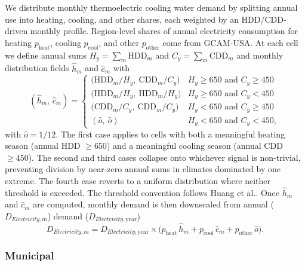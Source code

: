 \documentclass[fleqn,10pt]{wlscirep}
\begin{document}
We distribute monthly thermoelectric cooling water demand by splitting annual use into heating, cooling, and other shares, each weighted by an HDD/CDD-driven monthly profile. Region-level shares of annual electricity consumption for heating $p_{\mathrm{heat}}$, cooling $p_{\mathrm{cool}}$, and other $p_{\mathrm{other}}$ come from GCAM-USA. At each cell we define annual sums $H_y = \sum_m \text{HDD}_m$ and $C_y = \sum_m \text{CDD}_m$ and monthly distribution fields $\hat{h}_m$ and $\hat{c}_m$ with
\begin{equation}
(\hat{h}_m,\,\hat{c}_m) =
\begin{cases}
\big(\text{HDD}_m / H_y,\ \text{CDD}_m / C_y\big)      & H_y \ge 650 \text{ and } C_y \ge 450 \\[2pt]
\big(\text{HDD}_m / H_y,\ \text{HDD}_m / H_y\big)      & H_y \ge 650 \text{ and } C_y < 450 \\[2pt]
\big(\text{CDD}_m / C_y,\ \text{CDD}_m / C_y\big)      & H_y < 650 \text{ and } C_y \ge 450 \\[2pt]
(\hat{o},\ \hat{o})                                          & H_y < 650 \text{ and } C_y < 450,
\end{cases}
\label{eq:elec-cases}
\end{equation}
with $\hat{o} = 1/12$. 
The first case applies to cells with both a meaningful heating season (annual HDD $\ge 650$) and a meaningful cooling season (annual CDD $\ge 450$). The second and third cases collapse onto whichever signal is non-trivial, preventing division by near-zero annual sums in climates dominated by one extreme. The fourth case reverts to a uniform distribution where neither threshold is exceeded. The threshold convention follows Huang et al.\cite{Huang2018}. Once $\hat{h}_m$ and $\hat{c}_m$ are computed, monthly demand is then downscaled from annual ($D_{Electricity,m}$) demand ($D_{Electricity,\mathrm{year}}$)
\begin{equation}
D_{Electricity,m} = D_{Electricity,\mathrm{year}} \times \big(p_{\mathrm{heat}}\,\hat{h}_m + p_{\mathrm{cool}}\,\hat{c}_m + p_{\mathrm{other}}\,\hat{o}\big).
\label{eq:elec-demand}
\end{equation}


\subsubsection*{Municipal}
\end{document}
